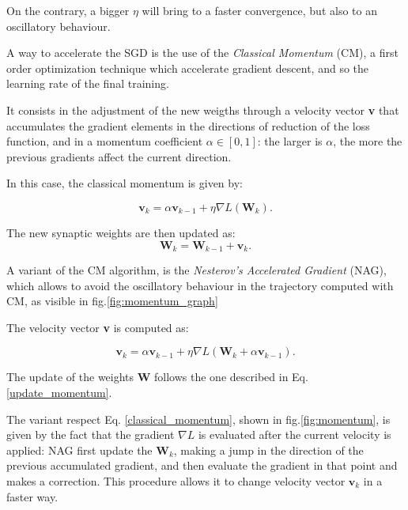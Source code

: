 			On the contrary, a bigger $\eta$ will bring to a faster convergence, but also to an oscillatory behaviour.

			A way to accelerate the SGD is the use of the \textit{Classical Momentum} (CM), a first order optimization technique which accelerate gradient descent, and so the learning rate of the final training.

			It consists in the adjustment of the new weigths through a velocity vector \textbf{v} that accumulates the gradient elements in the directions of reduction of the loss function, and in a momentum coefficient $\alpha \in [0,1]$: the larger is  $\alpha$, the more the previous gradients affect the current direction.

			In this case, the classical momentum is given by:

			\begin{equation}
				\label{classical_momentum}
				\textbf{v}_k = \alpha\textbf{v}_{k-1} + \eta\nabla\textit{L}(\textbf{W}_k).
			\end{equation}

			The new synaptic weights are then updated as:
			\begin{equation}
				\label{update_momentum}
				\textbf{W}_k = \textbf{W}_{k-1}  + \textbf{v}_k.
			\end{equation}

			A variant of the CM algorithm, is the \textit{Nesterov's Accelerated Gradient} (NAG), which allows to avoid the oscillatory behaviour in the trajectory computed with CM, as visible in fig.\ref{fig:momentum_graph}%

			The velocity vector \textbf{v} is computed as:

			\begin{equation}
				\label{nesterov_momentum}
				\textbf{v}_k = \alpha\textbf{v}_{k-1} + \eta\nabla\textit{L}(\textbf{W}_k + \alpha\textbf{v}_{k-1}).
			\end{equation}
			
			The update of the weights \textbf{W} follows the one described in Eq. \ref{update_momentum}.

			The variant respect Eq. \ref{classical_momentum}, shown in fig.\ref{fig:momentum}, is given by the fact that the gradient $\nabla\textit{L}$ is evaluated after the current velocity is applied: NAG first update the $\textbf{W}_k$, making a jump in the direction of the previous accumulated gradient, and then evaluate the gradient in that point and makes a correction. This procedure allows it to change velocity vector $\textbf{v}_{k}$ in a faster way.

